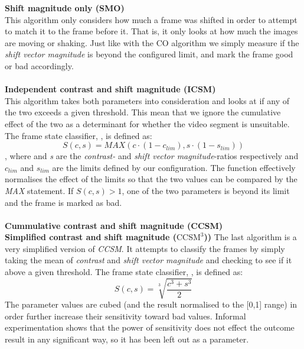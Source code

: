 \documentclass[12pt]{article}
\begin{document}
%
\textbf{Shift magnitude only (SMO)}\\
This algorithm only considers how much a frame was shifted in order to attempt to match it to the frame before it. That is, it only looks at how much the images are moving or shaking. Just like with the CO algorithm we simply measure if the \textit{shift vector magnitude} is beyond the configured limit, and mark the frame good or bad accordingly.\\\\
%
\textbf{Independent contrast and shift magnitude (ICSM)}\\
This algorithm takes both parameters into consideration and looks at if any of the two exceeds a given threshold. This mean that we ignore the cumulative effect of the two as a determinant for whether the video segment is unsuitable. The frame state classifier, , is defined as:
\[
S(c,s)=MAX(c \cdot (1-c_{lim}), s \cdot (1-s_{lim}))
\]
, where  and \textit{s} are the \textit{contrast-} and \textit{shift vector magnitude}-ratios respectively and $c_{lim}$ and $s_{lim}$ are the limits defined by our configuration. The function effectively normalises the effect of the limits so that the two values can be compared by the \textit{MAX} statement. If $S(c,s) > 1$, one of the two parameters is beyond its limit and the frame is marked as bad.\\\\
%
\textbf{Cummulative contrast and shift magnitude (CCSM)}\\
%
\textbf{Simplified contrast and shift magnitude ($\text{CCSM}^{3}$))}
%
The last algorithm is a very simplified version of \textit{CCSM}. It attempts to classify the frames by simply taking the mean of \textit{contrast} and \textit{shift vector magnitude} and checking to see if it above a given threshold. The frame state classifier, , is defined as:
\[
S(c,s)=\sqrt[3]{\frac{c^{3}+s^{3}}{2}}
\]
The parameter values are cubed (and the result normalised to the [0,1] range) in order further increase their sensitivity toward bad values. Informal experimentation shows that the power of sensitivity does not effect the outcome result in any significant way, so it has been left out as a parameter.
%
\end{document}
